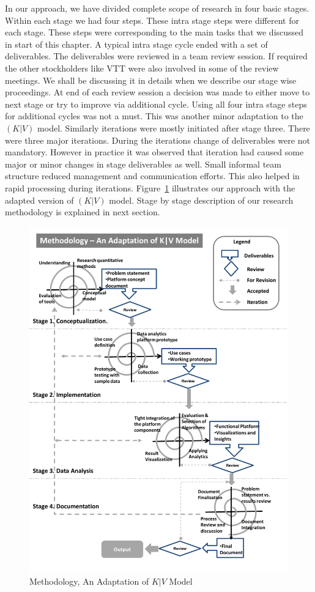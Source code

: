  In our approach, we have divided complete scope of research in four basic stages. Within each stage we had four steps. These intra stage steps were different for each stage. These steps were corresponding to the main tasks that we discussed in start of this chapter. A typical intra stage cycle ended with a set of deliverables. The deliverables were reviewed in a team review session. If required the other stockholders like VTT were also involved in some of the review meetings. We shall be discussing it in details when we describe our stage wise proceedings. At end of each review session a decision was made to either move to next stage or try to improve via additional cycle. Using all four intra stage steps for additional cycles was not a must. This was another minor adaptation to the \((K|V)\) model. Similarly iterations were mostly initiated after stage three. There were three major iterations. During the iterations change of deliverables were not mandatory. However in practice it was observed that iteration had caused some major or minor changes in stage deliverables as well. Small informal team structure reduced management and communication efforts. This also helped in rapid processing during iterations. Figure~\ref{fig:kv} illustrates our approach with the adapted version of \((K|V)\) model. Stage by stage description of our research methodology is explained in next section.   
 \begin{figure}[!h]
   \begin{center}
     \includegraphics[width=\textwidth]{images/kv_method.pdf}
     \caption{Methodology, An Adaptation of \(K|V\) Model}
     \label{fig:kv}
   \end{center}
 \end{figure} 
